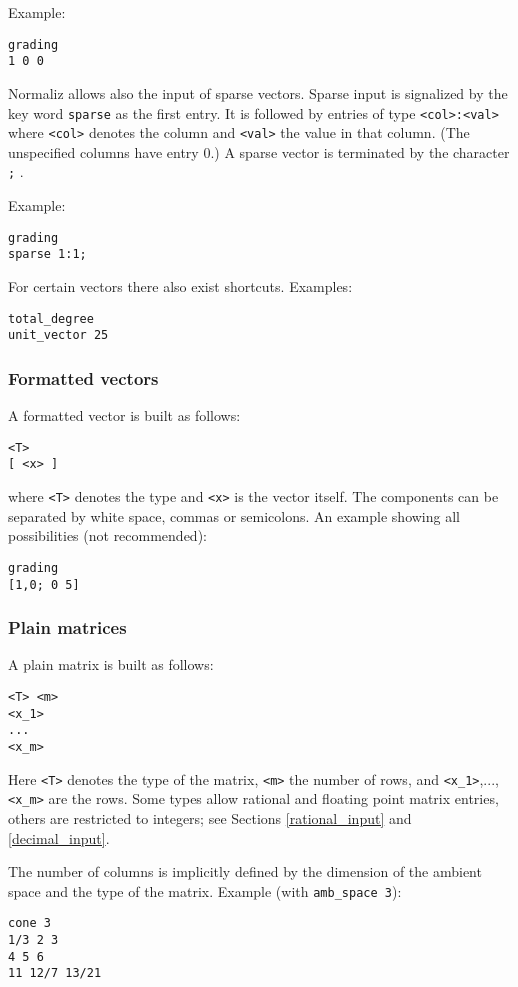 \documentclass[12pt,a4paper]{scrartcl}
\theoremstyle{definition}
\def\ttt{\texttt}
\begin{document}
Example:
\begin{Verbatim}
grading
1 0 0
\end{Verbatim}

Normaliz allows also the input of sparse vectors. Sparse input is signalized by the key word \verb|sparse| as the first entry. It is followed by entries of type \verb|<col>:<val>| where \verb|<col>| denotes the column and \verb|<val>| the value in that column. (The unspecified columns have entry $0$.) A sparse vector is terminated by the character \verb|;| . 

Example:
\begin{Verbatim}
grading
sparse 1:1;
\end{Verbatim}


For certain vectors there also exist shortcuts. Examples:
\begin{Verbatim}
total_degree
unit_vector 25
\end{Verbatim}


\subsubsection{Formatted vectors}

A formatted vector is built as follows:
\begin{Verbatim}
<T>
[ <x> ]
\end{Verbatim}
where \ttt{<T>} denotes the type and \ttt{<x>} is the vector itself. The components can be separated by white space, commas or semicolons. An example showing all possibilities (not recommended):
\begin{Verbatim}
grading
[1,0; 0 5]
\end{Verbatim}

\subsubsection{Plain matrices}

A plain matrix is built as follows:
\begin{Verbatim}
<T> <m>
<x_1>
...
<x_m>
\end{Verbatim}
Here \ttt{<T>} denotes the type of the matrix, \ttt{<m>} the number of rows, and \ttt{<x\_1>},...,\ttt{<x\_m>} are the rows. Some types allow rational and floating point matrix entries, others are restricted to integers; see Sections \ref{rational_input} and \ref{decimal_input}.

The number of columns is implicitly defined by the dimension of the ambient space and the type of the matrix. Example (with \verb|amb_space 3|):
\begin{Verbatim}
cone 3
1/3 2 3
4 5 6
11 12/7 13/21
\end{Verbatim}
\end{document}
